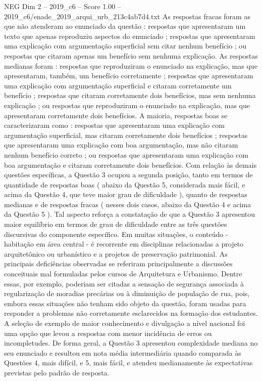 \begin{textsample}{NEG Dim 2 – 2019\_c6 – Score 1.00 – 2019\_c6/enade\_2019\_arqui\_urb\_213c4ab7d4.txt}
As respostas fracas foram as que não atenderam ao enunciado da questão : respostas que apresentaram um texto que apenas reproduziu aspectos do enunciado ; respostas que apresentaram uma explicação com argumentação superficial sem citar nenhum benefício ; ou respostas que citaram apenas um benefício sem nenhuma explicação.
As respostas medianas foram : respostas que reproduziram o enunciado na explicação, mas que apresentaram, também, um benefício corretamente ; respostas que apresentaram uma explicação com argumentação superficial e citaram corretamente um benefício ; respostas que citaram corretamente dois benefícios, mas sem nenhuma explicação ; ou respostas que reproduziram o enunciado na explicação, mas que apresentaram corretamente dois benefícios.
A maioria, respostas boas se caracterizaram como : respostas que apresentaram uma explicação com argumentação superficial, mas citaram corretamente dois benefícios ; respostas que apresentaram uma explicação com boa argumentação, mas não citaram nenhum benefício correto ; ou respostas que apresentaram uma explicação com boa argumentação e citaram corretamente dois benefícios.
Com relação às demais questões específicas, a Questão 3 ocupou a segunda posição, tanto em termos de quantidade de respostas boas ( abaixo da Questão 5, considerada mais fácil, e acima da Questão 4, que teve maior grau de dificuldade ), quanto de respostas medianas e de respostas fracas ( nesses dois casos, abaixo da Questão 4 e acima da Questão 5 ).
Tal aspecto reforça a constatação de que a Questão 3 apresentou maior equilíbrio em termos de grau de dificuldade entre as três questões discursivas do componente específico.
Em muitas situações, o conteúdo - habitação em área central - é recorrente em disciplinas relacionadas a projeto arquitetônico ou urbanístico e a projetos de preservação patrimonial.
As principais deficiências observadas se referiram principalmente a discussões conceituais mal formuladas pelos cursos de Arquitetura e Urbanismo.
Dentre essas, por exemplo, poderiam ser citadas a sensação de segurança associada à regularização de moradias precárias ou à diminuição de população de rua, pois, embora essas situações não tenham sido objeto da questão, foram usadas para responder a problemas não corretamente esclarecidos na formação dos estudantes.
A seleção de exemplo de maior conhecimento e divulgação a nível nacional foi uma opção que levou a respostas com menor incidência de erros ou incompletudes.
De forma geral, a Questão 3 apresentou complexidade mediana no seu enunciado e resultou em nota média intermediária quando comparada às Questões 4, mais difícil, e 5, mais fácil, e atendeu medianamente às expectativas previstas pelo padrão de resposta.

\end{textsample}

